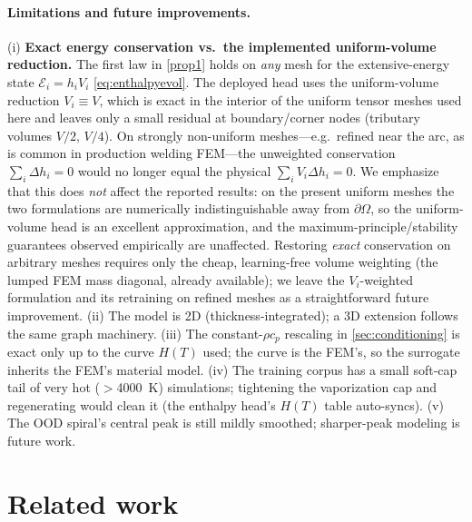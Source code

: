 \documentclass[11pt]{article}
\theoremstyle{definition}
\begin{document}
\paragraph{Limitations and future improvements.}
(i) \textbf{Exact energy conservation vs.\ the implemented uniform-volume reduction.}
The first law in \cref{prop1} holds on \emph{any} mesh for the extensive-energy state
$\mathcal E_i=h_iV_i$ \cref{eq:enthalpyevol}. The deployed head uses the uniform-volume
reduction $V_i\equiv V$, which is exact in the interior of the uniform tensor meshes used
here and leaves only a small residual at boundary/corner nodes (tributary volumes
$V/2,\,V/4$). On strongly non-uniform meshes---e.g.\ refined near the arc, as is common in
production welding FEM---the unweighted conservation $\sum_i\Delta h_i=0$ would no longer
equal the physical $\sum_i V_i\Delta h_i=0$. We emphasize that this does \emph{not} affect
the reported results: on the present uniform meshes the two formulations are numerically
indistinguishable away from $\partial\Omega$, so the uniform-volume head is an excellent
approximation, and the maximum-principle/stability guarantees observed empirically are
unaffected. Restoring \emph{exact} conservation on arbitrary meshes requires only the
cheap, learning-free volume weighting (the lumped FEM mass diagonal, already available);
we leave the $V_i$-weighted formulation and its retraining on refined meshes as a
straightforward future improvement.
(ii) The model is 2D (thickness-integrated); a 3D extension follows the same graph
machinery.
(iii) The constant-$\rho c_p$ rescaling in \cref{sec:conditioning} is exact only up to the
curve $H(T)$ used; the curve is the FEM's, so the surrogate inherits the FEM's material
model.
(iv) The training corpus has a small soft-cap tail of very hot ($>$\SI{4000}{K})
simulations; tightening the vaporization cap and regenerating would clean it (the enthalpy
head's $H(T)$ table auto-syncs).
(v) The OOD spiral's central peak is still mildly smoothed; sharper-peak modeling is
future work.

\section{Related work}
\end{document}
